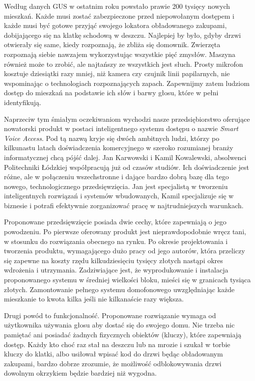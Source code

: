 \documentclass[../main.tex]{subfiles}
\begin{document}
 {

    Według danych GUS w ostatnim roku powstało prawie 200 tysięcy nowych mieszkań. Każde musi zostać
    zabezpieczone przed niepowołanym dostępem i każde musi być gotowe przyjąć swojego lokatora
    obładowanego zakupami, dobijającego się na klatkę schodową w deszczu. Najlepiej by było, gdyby
    drzwi otwierały się same, kiedy rozpoznają, że zbliża się domownik. Zwierzęta rozpoznają siebie
    nawzajem wykorzystując wszystkie pięć zmysłów. Maszyna również może to zrobić, ale najtańszy ze
    wszystkich jest słuch. Prosty mikrofon kosztuje dziesiątki razy mniej, niż kamera czy czujnik
    linii papilarnych, nie wspominając o technologiach rozpoznających zapach. Zapewnijmy zatem
    ludziom dostęp do mieszkań na podstawie ich słów i barwy głosu, które w pełni identyfikują.

    Naprzeciw tym śmiałym oczekiwaniom wychodzi nasze przedsiębiorstwo oferujące nowatorski produkt
    w postaci inteligentnego systemu dostępu o nazwie \emph{Smart Voice Access}. Pod tą nazwą kryje
    się dwóch ambitnych ludzi, którzy po kilkunastu latach doświadczenia komercyjnego w
    szeroko rozumianej branży informatycznej chcą pójść dalej. Jan Karwowski i Kamil Kowalewski,
    absolwenci Politechniki Łódzkiej współpracują już od czasów studiów. Ich doświadczenie jest
    różne, ale w połączeniu wszechstronne i dające bardzo dobrą bazę dla tego nowego,
    technologicznego przedsięwzięcia. Jan jest specjalistą w tworzeniu inteligentnych
    rozwiązań i systemów wbudowanych, Kamil specjalizuje się w biznesie i potrafi efektywnie
    zorganizować pracę w najtrudniejszych warunkach.

    Proponowane przedsięwzięcie posiada dwie cechy, które zapewniają o jego powodzeniu. Po pierwsze
    oferowany produkt jest nieprawdopodobnie wręcz tani, w stosunku do rozwiązania obecnego na
    rynku. Po okresie projektowania i tworzenia produktu, wymagającego dużo pracy od jego autorów,
    która przeliczy się zapewne na koszty rzędu kilkudziesięciu tysięcy złotych nastąpi okres
    wdrożenia i utrzymania. Zadziwiające jest, że wyprodukowanie i instalacja proponowanego systemu
    w średniej wielkości bloku, mieści się w granicach tysiąca złotych. Zamontowanie pełnego systemu
    domofonowego uwzględniając każde mieszkanie to kwota kilka jeśli nie kilkanaście razy większa.

    Drugi powód to funkcjonalność. Proponowane rozwiązanie wymaga od użytkownika używania głosu aby
    dostać się do swojego domu. Nie trzeba nic pamiętać ani posiadać żadnych fizycznych obiektów
    (kluczy), które zapewniają dostęp. Każdy kto choć raz stał na deszczu lub na mrozie i szukał w
    torbie kluczy do klatki, albo usiłował wpisać kod do drzwi będąc obładowanym zakupami, bardzo
    dobrze zrozumie, że możliwość odblokowywania drzwi dowolnym okrzykiem będzie bardziej
    niż wygodna.

}
\end{document}
